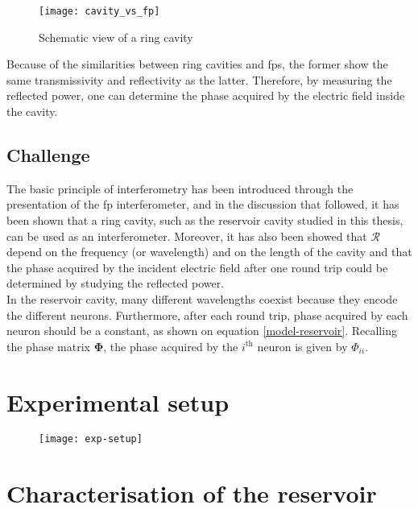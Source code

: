 \begin{figure}[h]
	\centering
	\texttt{[image: cavity\_vs\_fp]}
	\caption{Schematic view of a ring cavity}
	\label{cavity_vs_fp}
\end{figure}

Because of the similarities between ring cavities and \glspl{fp}, the former show the same transmissivity and reflectivity as the latter. Therefore, by measuring the reflected power, one can determine the phase acquired by the electric field inside the cavity.


\subsection{Challenge}

The basic principle of interferometry has been introduced through the presentation of the \gls{fp} interferometer, and in the discussion that followed, it has been shown that a ring cavity, such as the reservoir cavity studied in this thesis, can be used as an interferometer. Moreover, it has also been showed that $\mathcal{R}$ depend on the frequency (or wavelength) and on the length of the cavity and that the phase acquired by the incident electric field after one round trip could be determined by studying the reflected power.\\

In the reservoir cavity, many different wavelengths coexist because they encode the different neurons. Furthermore, after each round trip, phase acquired by each neuron should be a constant, as shown on equation \eqref{model-reservoir}. Recalling the phase matrix $\mathbf{\Phi}$, the phase acquired by the $i^{\text{th}}$ neuron is given by $\Phi_{ii}$.


\section{Experimental setup}


\begin{figure}[h]
	\centering
	\texttt{[image: exp-setup]}
\end{figure}


\section{Characterisation of the reservoir}

